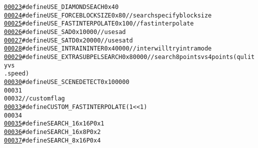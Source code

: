 \begin{footnotesize}
\begin{alltt}
\hypertarget{_consts4_standard_8h_source_l00023}{}\hyperlink{_consts4_standard_8h_aac301887f968454eb7701573bd2bd71b}{00023} \textcolor{preprocessor}{}\textcolor{preprocessor}{#define USE\_DIAMONDSEACH        0x40}
\hypertarget{_consts4_standard_8h_source_l00024}{}\hyperlink{_consts4_standard_8h_a167d3f839b7f0edd7dd181f97da552e7}{00024} \textcolor{preprocessor}{}\textcolor{preprocessor}{#define USE\_FORCEBLOCKSIZE      0x80 // search specify block size}
\hypertarget{_consts4_standard_8h_source_l00025}{}\hyperlink{_consts4_standard_8h_a97cddf47f66325ada703b358ad950c8a}{00025} \textcolor{preprocessor}{}\textcolor{preprocessor}{#define USE\_FASTINTERPOLATE     0x100  // fast interpolate}
\hypertarget{_consts4_standard_8h_source_l00026}{}\hyperlink{_consts4_standard_8h_a90d527fe5780a242cbad8dfd10233b7f}{00026} \textcolor{preprocessor}{}\textcolor{preprocessor}{#define USE\_SAD                 0x10000  // use sad}
\hypertarget{_consts4_standard_8h_source_l00027}{}\hyperlink{_consts4_standard_8h_a43531a8a23336edfffeaa686c8b86195}{00027} \textcolor{preprocessor}{}\textcolor{preprocessor}{#define USE\_SATD                0x20000  // use satd}
\hypertarget{_consts4_standard_8h_source_l00028}{}\hyperlink{_consts4_standard_8h_ae182c9d53f714d72830ddf58cd81376a}{00028} \textcolor{preprocessor}{}\textcolor{preprocessor}{#define USE\_INTRAININTER        0x40000 // inter will try intra mode}
\hypertarget{_consts4_standard_8h_source_l00029}{}\hyperlink{_consts4_standard_8h_a8c7486356cde22fcf13d265a9d747bb0}{00029} \textcolor{preprocessor}{}\textcolor{preprocessor}{#define USE\_EXTRASUBPELSEARCH   0x80000 // search 8 points vs 4 points (qulity vs
      . speed)}
\hypertarget{_consts4_standard_8h_source_l00030}{}\hyperlink{_consts4_standard_8h_adb88f8eebfa7c2c77ec76d392c679cbc}{00030} \textcolor{preprocessor}{}\textcolor{preprocessor}{#define USE\_SCENEDETECT         0x100000}
00031 \textcolor{preprocessor}{}
00032 \textcolor{comment}{// custom flag}
\hypertarget{_consts4_standard_8h_source_l00033}{}\hyperlink{_consts4_standard_8h_ad372f54980a269891feacf31acc5c524}{00033} \textcolor{preprocessor}{#define CUSTOM\_FASTINTERPOLATE (1 << 1)}
00034 \textcolor{preprocessor}{}
\hypertarget{_consts4_standard_8h_source_l00035}{}\hyperlink{_consts4_standard_8h_a3ad1858d8d3f9da8c8808e015afcbfc9}{00035} \textcolor{preprocessor}{#define SEARCH\_16x16P 0x1}
\hypertarget{_consts4_standard_8h_source_l00036}{}\hyperlink{_consts4_standard_8h_a6aece9d8387b632d5abf920b1babc7d3}{00036} \textcolor{preprocessor}{}\textcolor{preprocessor}{#define SEARCH\_16x8P  0x2}
\hypertarget{_consts4_standard_8h_source_l00037}{}\hyperlink{_consts4_standard_8h_a49859a6522645fa8a31d0eb42cc46b93}{00037} \textcolor{preprocessor}{}\textcolor{preprocessor}{#define SEARCH\_8x16P  0x4}

\end{alltt}
\end{footnotesize}

